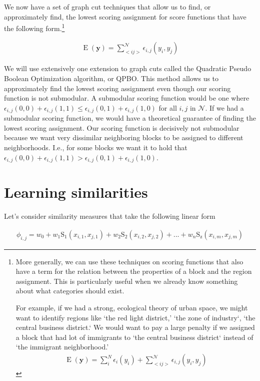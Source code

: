 We now have a set of graph cut techniques that allow us to find, or
approximately find, the lowest scoring assignment for score functions
that have the following form.\footnote{More generally, we can use
  these techniques on scoring functions that also have a term for the
  relation between the properties of a block and the region
  assignment. This is particularly useful when we already know
  something about what categories should exist. 

  For example, if we had a strong, ecological theory of urban space,
  we might want to identify regions like `the red light district,'
  `the zone of industry`, `the central business district.` We would
  want to pay a large penalty if we assigned a block that had lot of
  immigrants to `the central business district` instead of `the
  immigrant neighborhood.'
\begin{align}
\operatorname{E}(\mathbf{y}) = \sum_i^N\epsilon_i(y_i) + \sum_{<i j>}^{\mathcal{N}}\epsilon_{i,j}(y_i,y_j)
\end{align}
}

\begin{align}
\operatorname{E}(\mathbf{y}) = \sum_{<i j>}^{\mathcal{N}}\epsilon_{i,j}(y_i,y_j)
\end{align}

We will use extensively one extension to graph cuts called the
Quadratic Pseudo Boolean Optimization algorithm, or QPBO. This method
allows us to approximately find the lowest scoring assignment even
though our scoring function is not submodular. A submodular scoring
function would be one where $\epsilon_{i,j}(0,0) + \epsilon_{i,j}(1,1)
\leq \epsilon_{i,j}(0,1) + \epsilon_{i,j}(1,0)$ for all $i,j$ in
$\mathcal{N}$. If we had a submodular scoring function, we would have a
theoretical guarantee of finding the lowest scoring assignment. Our
scoring function is decisively not submodular because we want
very dissimilar neighboring blocks to be assigned to different
neighborhoods. I.e., for some blocks we want it to hold that
$\epsilon_{i,j}(0,0) + \epsilon_{i,j}(1,1) \boldsymbol{>}
\epsilon_{i,j}(0,1) + \epsilon_{i,j}(1,0)$.


\section*{Learning similarities}
Let's consider similarity measures that take the following linear form

\begin{align}
\phi_{i,j} = w_0 + w_1\operatorname{S_1}(x_{i,1}, x_{j,1}) +
w_2\operatorname{S_2}(x_{i,2}, x_{j,2}) + ... +
w_n\operatorname{S_z}(x_{i,m},x_{j,m})
\end{align} 

